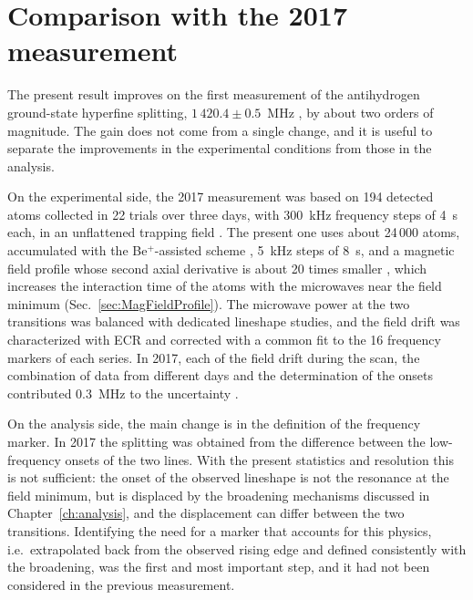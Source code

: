 \section{Comparison with the 2017 measurement} \label{sec:comparison2017}

The present result improves on the first measurement of the antihydrogen ground-state hyperfine splitting, $1\,420.4 \pm 0.5$~MHz \cite{ALPHA:2017fsh}, by about two orders of magnitude. The gain does not come from a single change, and it is useful to separate the improvements in the experimental conditions from those in the analysis.

On the experimental side, the 2017 measurement was based on 194 detected atoms collected in 22 trials over three days, with \SI{300}{\kilo\hertz} frequency steps of \SI{4}{\second} each, in an unflattened trapping field \cite{ALPHA:2017fsh}. The present one uses about 24\,000 atoms, accumulated with the Be$^+$-assisted scheme \cite{Akbari:2025mli}, \SI{5}{\kilo\hertz} steps of \SI{8}{\second}, and a magnetic field profile whose second axial derivative is about 20 times smaller \cite{ALPHA:2026lbu}, which increases the interaction time of the atoms with the microwaves near the field minimum (Sec.~\ref{sec:MagFieldProfile}). The microwave power at the two transitions was balanced with dedicated lineshape studies, and the field drift was characterized with ECR and corrected with a common fit to the 16 frequency markers of each series. In 2017, each of the field drift during the scan, the combination of data from different days and the determination of the onsets contributed \SI{0.3}{\mega\hertz} to the uncertainty \cite{ALPHA:2017fsh}.

On the analysis side, the main change is in the definition of the frequency marker. In 2017 the splitting was obtained from the difference between the low-frequency onsets of the two lines. With the present statistics and resolution this is not sufficient: the onset of the observed lineshape is not the resonance at the field minimum, but is displaced by the broadening mechanisms discussed in Chapter~\ref{ch:analysis}, and the displacement can differ between the two transitions. Identifying the need for a marker that accounts for this physics, i.e.\ extrapolated back from the observed rising edge and defined consistently with the broadening, was the first and most important step, and it had not been considered in the previous measurement.

